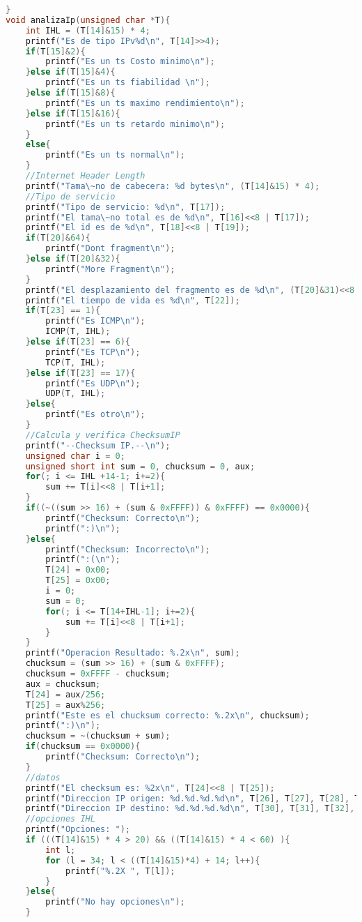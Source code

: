 \begin{lstlisting}[language={C}, caption={Analizador de tramas en C}, label={Script}]
}
void analizaIp(unsigned char *T){
    int IHL = (T[14]&15) * 4;
	printf("Es de tipo IPv%d\n", T[14]>>4);
	if(T[15]&2){
		printf("Es un ts Costo minimo\n");
	}else if(T[15]&4){
		printf("Es un ts fiabilidad \n");
	}else if(T[15]&8){
		printf("Es un ts maximo rendimiento\n");
	}else if(T[15]&16){
		printf("Es un ts retardo minimo\n");
	}
    else{
        printf("Es un ts normal\n");
    }
    //Internet Header Length
    printf("Tama\~no de cabecera: %d bytes\n", (T[14]&15) * 4);
    //Tipo de servicio
    printf("Tipo de servicio: %d\n", T[17]);
	printf("El tama\~no total es de %d\n", T[16]<<8 | T[17]);
	printf("El id es de %d\n", T[18]<<8 | T[19]);
	if(T[20]&64){
		printf("Dont fragment\n");
	}else if(T[20]&32){
		printf("More Fragment\n");
	}
	printf("El desplazamiento del fragmento es de %d\n", (T[20]&31)<<8 | T[21]);
	printf("El tiempo de vida es %d\n", T[22]);
	if(T[23] == 1){
		printf("Es ICMP\n");
        ICMP(T, IHL);
	}else if(T[23] == 6){
        printf("Es TCP\n");
        TCP(T, IHL);
    }else if(T[23] == 17){
        printf("Es UDP\n");
        UDP(T, IHL);
    }else{
        printf("Es otro\n");
    }
    //Calcula y verifica ChecksumIP
    printf("--Checksum IP.--\n");
    unsigned char i = 0;
    unsigned short int sum = 0, chucksum = 0, aux;
    for(; i <= IHL +14-1; i+=2){
        sum += T[i]<<8 | T[i+1];
    }
    if((~((sum >> 16) + (sum & 0xFFFF)) & 0xFFFF) == 0x0000){
        printf("Checksum: Correcto\n");
        printf(":)\n");
    }else{
        printf("Checksum: Incorrecto\n");
        printf(":(\n");
        T[24] = 0x00;
        T[25] = 0x00;
        i = 0;
        sum = 0;
        for(; i <= T[14+IHL-1]; i+=2){
            sum += T[i]<<8 | T[i+1];
        }   
    }
    printf("Operacion Resultado: %.2x\n", sum);
    chucksum = (sum >> 16) + (sum & 0xFFFF);
    chucksum = 0xFFFF - chucksum;
    aux = chucksum;
    T[24] = aux/256;
    T[25] = aux%256;
    printf("Este es el chucksum correcto: %.2x\n", chucksum);
    printf(":)\n");
    chucksum = ~(chucksum + sum);
    if(chucksum == 0x0000){
        printf("Checksum: Correcto\n");
    }
    //datos
    printf("El checksum es: %2x\n", T[24]<<8 | T[25]);
	printf("Direccion IP origen: %d.%d.%d.%d\n", T[26], T[27], T[28], T[29]);
	printf("Direccion IP destino: %d.%d.%d.%d\n", T[30], T[31], T[32], T[33]);
    //opciones IHL
    printf("Opciones: ");
    if (((T[14]&15) * 4 > 20) && ((T[14]&15) * 4 < 60) ){
        int l;
        for (l = 34; l < ((T[14]&15)*4) + 14; l++){
            printf("%.2X ", T[l]);
        }
    }else{
        printf("No hay opciones\n");
    }
    

\end{lstlisting}
